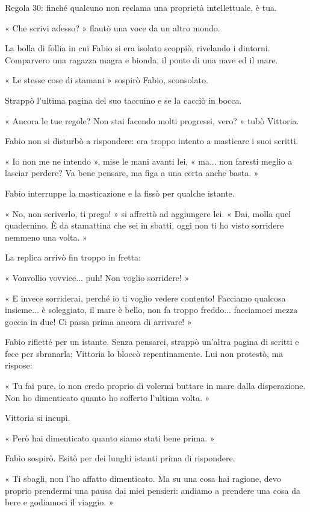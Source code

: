Regola 30: finché qualcuno non reclama una proprietà intellettuale, è tua.

« Che scrivi adesso? » flautò una voce da un altro mondo.

La bolla di follia in cui Fabio si era isolato scoppiò, rivelando i dintorni. Comparvero una ragazza magra e bionda, il ponte di una nave ed il mare.

« Le stesse cose di stamani » sospirò Fabio, sconsolato.

Strappò l'ultima pagina del suo taccuino e se la cacciò in bocca.

« Ancora le tue regole? Non stai facendo molti progressi, vero? » tubò Vittoria.

Fabio non si disturbò a rispondere: era troppo intento a masticare i suoi scritti.

« Io non me ne intendo », mise le mani avanti lei, « ma... non faresti meglio a lasciar perdere? Va bene pensare, ma figa a una certa anche basta. »

Fabio interruppe la masticazione e la fissò per qualche istante.

« No, non scriverlo, ti prego! » si affrettò ad aggiungere lei. « Dai, molla quel quadernino. È da stamattina che sei in sbatti, oggi non ti ho visto sorridere nemmeno una volta. »

La replica arrivò fin troppo in fretta:

« Vonvollio vovviee... puh! Non voglio sorridere! » 

« E invece sorriderai, perché io ti voglio vedere contento! Facciamo qualcosa insieme... è soleggiato, il mare è bello, non fa troppo freddo... facciamoci mezza goccia in due! Ci passa prima ancora di arrivare! »

Fabio rifletté per un istante. Senza pensarci, strappò un'altra pagina di scritti e fece per sbranarla; Vittoria lo bloccò repentinamente. Lui non protestò, ma rispose:

« Tu fai pure, io non credo proprio di volermi buttare in mare dalla disperazione. Non ho dimenticato quanto ho sofferto l'ultima volta. »

Vittoria si incupì.

« Però hai dimenticato quanto siamo stati bene prima. »

Fabio sospirò. Esitò per dei lunghi istanti prima di rispondere.

« Ti sbagli, non l'ho affatto dimenticato. Ma su una cosa hai ragione, devo proprio prendermi una pausa dai miei pensieri: andiamo a prendere una cosa da bere e godiamoci il viaggio. »

